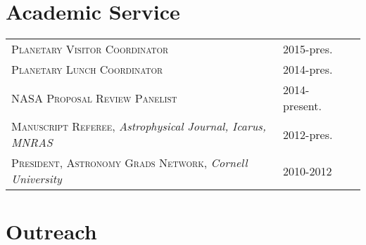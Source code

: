 \documentclass[10pt]{article} %
\begin{document}

\section{Academic Service}

\begin{tabular}{l>{\hfill}p{4.5cm}r}
\textsc{Planetary Visitor Coordinator} & 2015-pres. \\
\textsc{Planetary Lunch Coordinator} & 2014-pres. \\
\textsc{NASA Proposal Review Panelist} & 2014-present.\\
\textsc{Manuscript Referee}, {\it Astrophysical Journal, Icarus, MNRAS} & 2012-pres.\\
\textsc{President, Astronomy Grads Network}, {\it Cornell University} & 2010-2012\\
\end{tabular}


\section{Outreach}
\end{document}

